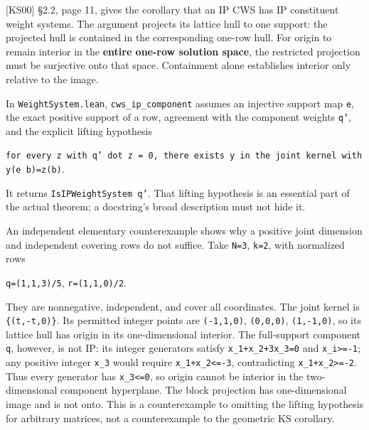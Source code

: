 \documentclass[11pt,a4paper,oneside]{report}
\begin{document}
{[}KS00{]} §2.2, page 11, gives the corollary that an IP CWS has IP
constituent weight systems. The argument projects its lattice hull to
one support: the projected hull is contained in the corresponding
one-row hull. For origin to remain interior in the \textbf{entire
one-row solution space}, the restricted projection must be surjective
onto that space. Containment alone establishes interior only relative to
the image.

In \texttt{WeightSy\allowbreak{}stem.\allowbreak{}lean},
\texttt{cws\_\allowbreak{}ip\_\allowbreak{}componen\allowbreak{}t}
assumes an injective support map \texttt{e}, the exact positive support
of a row, agreement with the component weights \texttt{q'}, and the
explicit lifting hypothesis

\texttt{for every z with q' dot z =\allowbreak{} 0,\allowbreak{} there exists y in the joint kernel with y(\allowbreak{}e b)\allowbreak{}=\allowbreak{}z(\allowbreak{}b)}.

It returns \texttt{IsIPWeig\allowbreak{}htSystem\allowbreak{} q'}. That
lifting hypothesis is an essential part of the actual theorem; a
docstring's broad description must not hide it.

An independent elementary counterexample shows why a positive joint
dimension and independent covering rows do not suffice. Take
\texttt{N=\allowbreak{}3}, \texttt{k=\allowbreak{}2}, with normalized
rows

\texttt{q=\allowbreak{}(\allowbreak{}1,\allowbreak{}1,\allowbreak{}3)\allowbreak{}/\allowbreak{}5},
\texttt{r=\allowbreak{}(\allowbreak{}1,\allowbreak{}1,\allowbreak{}0)\allowbreak{}/\allowbreak{}2}.

They are nonnegative, independent, and cover all coordinates. The joint
kernel is
\texttt{\{(\allowbreak{}t,\allowbreak{}-\allowbreak{}t,\allowbreak{}0)\allowbreak{}\}}.
Its permitted integer points are
\texttt{(\allowbreak{}-\allowbreak{}1,\allowbreak{}1,\allowbreak{}0)},
\texttt{(\allowbreak{}0,\allowbreak{}0,\allowbreak{}0)},
\texttt{(\allowbreak{}1,\allowbreak{}-\allowbreak{}1,\allowbreak{}0)},
so its lattice hull has origin in its one-dimensional interior. The
full-support component \texttt{q}, however, is not IP: its integer
generators satisfy
\texttt{x\_\allowbreak{}1+x\_\allowbreak{}2+3x\_\allowbreak{}3=\allowbreak{}0}
and \texttt{x\_\allowbreak{}i>=\allowbreak{}-\allowbreak{}1}; any
positive integer \texttt{x\_\allowbreak{}3} would require
\texttt{x\_\allowbreak{}1+x\_\allowbreak{}2<=\allowbreak{}-\allowbreak{}3},
contradicting
\texttt{x\_\allowbreak{}1+x\_\allowbreak{}2>=\allowbreak{}-\allowbreak{}2}.
Thus every generator has \texttt{x\_\allowbreak{}3<=\allowbreak{}0}, so
origin cannot be interior in the two-dimensional component hyperplane.
The block projection has one-dimensional image and is not onto. This is
a counterexample to omitting the lifting hypothesis for arbitrary
matrices, not a counterexample to the geometric KS corollary.
\end{document}
